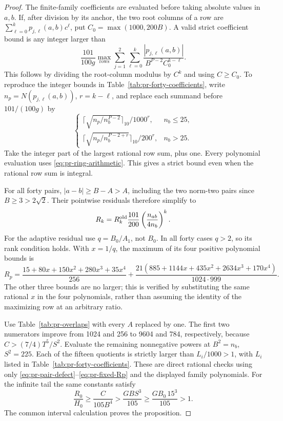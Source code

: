 \documentclass[12pt]{article}
\numberwithin{equation}{section}
\begin{document}
\begin{proof}
The finite-family coefficients are evaluated before taking absolute
values in \(a,b\). If, after division by its anchor, the two root
columns of a row are
\(\sum_{\ell=0}^k p_{j,\ell}(a,b)c^\ell\), put
\(C_0=\max(1000,200B)\). A valid strict coefficient bound is any
integer larger than
\begin{equation}\label{eq:pr-fixed-M}
 \frac{101}{100g}\max_{\text{rows}}\sum_{j=1}^2\sum_{\ell=0}^k
     \frac{|p_{j,\ell}(a,b)|}{B^{P-2}C_0^{k-\ell}}.
\end{equation}
This follows by dividing the root-column modulus by \(C^k\) and using
\(C\ge C_0\). To reproduce the integer bounds in
Table~\ref{tab:pr-forty-coefficients}, write
\(n_p=N(p_{j,\ell}(a,b))\), \(r=k-\ell\), and replace each summand
before \(101/(100g)\) by
\[
 \begin{cases}
 \lceil\sqrt{n_p/n_b^{P-2}}\rceil_{10}/1000^r,&n_b\le25,\\
 \lceil\sqrt{n_p/n_b^{P-2+r}}\rceil_{10}/200^r,&n_b>25.
 \end{cases}
\]
Take the integer part of the largest rational row sum, plus one.
Every polynomial evaluation uses \eqref{eq:pr-ring-arithmetic}.
This gives a strict bound even when the rational row sum is integral.

For all forty pairs, \(|a-b|\ge B-A>A\), including the two norm-two
pairs since \(B\ge3>2\sqrt2\). Their pointwise residuals therefore
simplify to
\begin{equation}\label{eq:pr-fixed-R}
 R_k=R_k^{\rm old}\frac{101}{200}
                    \left(\frac{n_{ab}}{4n_b}\right)^k.
\end{equation}
For the adaptive residual use \(q=B_0/A_1\), not \(B_0\).
In all forty cases \(q>2\), so its rank condition holds. With
\(x=1/q\), the maximum of its four positive polynomial bounds is
\begin{equation}\label{eq:pr-fixed-Rp}
 R_p=\frac{15+80x+150x^2+280x^3+35x^4}{256}
 +\frac{21(885+1144x+435x^2+2634x^3+170x^4)}{1024\cdot999}.
\end{equation}
The other three bounds are no larger; this is verified by substituting
the same rational \(x\) in the four polynomials, rather than assuming
the identity of the maximizing row at an arbitrary ratio.

Use Table~\ref{tab:pr-overlaps} with every \(A\) replaced by one.
The first two numerators improve from 1024 and 256 to 9604 and 784,
respectively, because \(C>(7/4)T^5/S^2\). Evaluate the remaining
nonnegative powers at \(B^2=n_b\), \(S^2=225\). Each of the fifteen
quotients is strictly larger than
\(L_i/1000>1\), with \(L_i\) listed in
Table~\ref{tab:pr-forty-coefficients}. These are direct rational
checks using only \eqref{eq:pr-pair-defect}--\eqref{eq:pr-fixed-Rp}
and the displayed family polynomials. For the infinite tail the same
constants satisfy
\[
 \frac{R_0}{H_0}\ge\frac{C}{105B^4}
   >\frac{GBS^3}{105}\ge\frac{GB_0\,15^3}{105}>1.
\]
The common interval calculation proves the proposition.
\end{proof}
\end{document}
